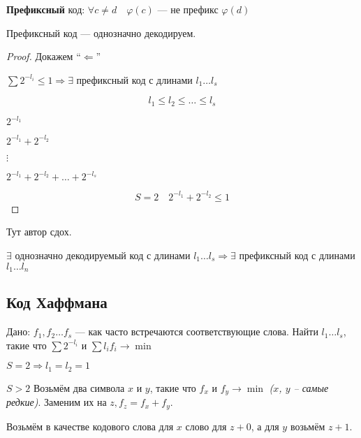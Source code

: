 \begin{definition}
    \textbf{Префиксный} код: $\forall c\not=d \quad \varphi(c)$ --- не префикс $\varphi(d)$
\end{definition}

\begin{lemma}
    Префиксный код --- однозначно декодируем.
\end{lemma}

\begin{proof}
    Докажем ``$\Leftarrow$''

    $\sum 2^{-l_i}\leq 1 \Rightarrow \exists$ префиксный код с длинами $l_1\ldots l_s$

    $$l_1\leq l_2\leq \ldots\leq l_s$$
    
    $2^{-l_1}$

    $2^{-l_1}+2^{-l_2}$

    $\vdots$

    $2^{-l_1}+2^{-l_2}+\ldots+2^{-l_s}$

    $$S=2 \quad 2^{-l_1}+2^{-l_2}\leq 1$$
\end{proof}

Тут автор сдох.

\begin{consequence}
    $\exists$ однозначно декодируемый код с длинами $l_1\ldots l_s \Rightarrow \exists$ префиксный код с длинами $l_1\ldots l_n$
\end{consequence}

\subsection{Код Хаффмана}

Дано: $f_1,f_2\ldots f_s$ --- как часто встречаются соответствующие слова. Найти $l_1\ldots l_s$, такие что $\sum 2^{-l_i}$ и $\sum l_if_i\to \min$

$S=2\Rightarrow l_1=l_2=1$

$S>2$ Возьмём два символа $x$ и $y$, такие что $f_x$ и $f_y\to\min$ \textit{($x$, $y$ -- самые редкие)}. Заменим их на $z, f_z=f_x+f_y$.

Возьмём в качестве кодового слова для $x$ слово для $z + 0$, а для $y$ возьмём $z + 1$.


